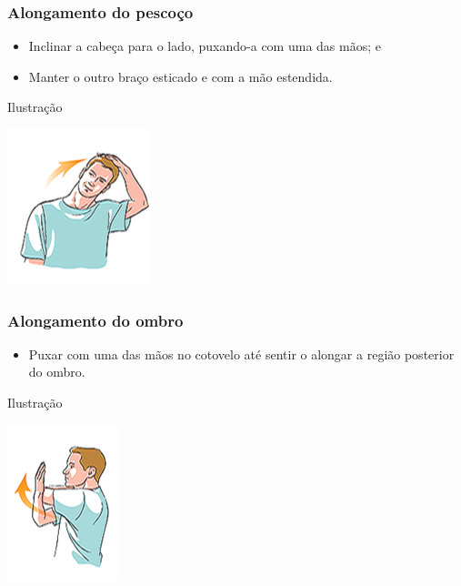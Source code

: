 \documentclass[aspectratio=169]{beamer} %
\begin{document}
\begin{frame}
	\frametitle{Alongamento do pesco\c co}
	
	\begin{itemize}
		\item Inclinar a cabe\c ca para o lado, puxando-a com uma das mãos; e
		\item Manter o outro bra\c co esticado e com a mão estendida.
	\end{itemize}
	\vfill
	
	\begin{exampleblock}{Ilustra\c cão}
		\begin{center}
			\includegraphics[scale=0.5]{img/alongamento1}
		\end{center}			
	\end{exampleblock}
\end{frame}

\begin{frame}
	\frametitle{Alongamento do ombro}
	
	\begin{itemize}
		\item Puxar com uma das mãos no cotovelo até sentir o alongar a região posterior do ombro.
	\end{itemize}
	\vfill
	
	\begin{exampleblock}{Ilustra\c cão}
		\begin{center}
			\includegraphics[scale=0.5]{img/alongamento2}
		\end{center}			
	\end{exampleblock}
\end{frame}
\end{document}
